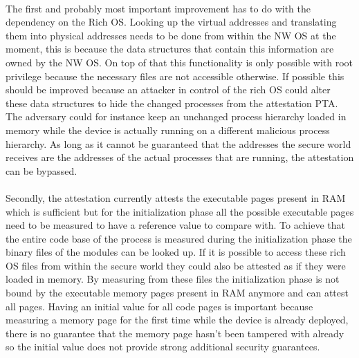 \paragraph*{}%
The first and probably most important improvement has to do with the dependency on the Rich OS. Looking up the virtual addresses and translating them into physical addresses needs to be done from within the NW OS at the moment, this is because the data structures that contain this information are owned by the NW OS. On top of that this functionality is only possible with root privilege because the necessary files are not accessible otherwise. If possible this should be improved because an attacker in control of the rich OS could alter these data structures to hide the changed processes from the attestation PTA. The adversary could for instance keep an unchanged process hierarchy loaded in memory while the device is actually running on a different malicious process hierarchy. As long as it cannot be guaranteed that the addresses the secure world receives are the addresses of the actual processes that are running, the attestation can be bypassed. 

\paragraph*{}%
Secondly, the attestation currently attests the executable pages present in RAM which is sufficient but for the initialization phase all the possible executable pages need to be measured to have a reference value to compare with. To achieve that the entire code base of the process is measured during the initialization phase the binary files of the modules can be looked up. If it is possible to access these rich OS files from within the secure world they could also be attested as if they were loaded in memory. By measuring from these files the initialization phase is not bound by the executable memory pages present in RAM anymore and can attest all pages. Having an initial value for all code pages is important because measuring a memory page for the first time while the device is already deployed, there is no guarantee that the memory page hasn't been tampered with already so the initial value does not provide strong additional security guarantees.

